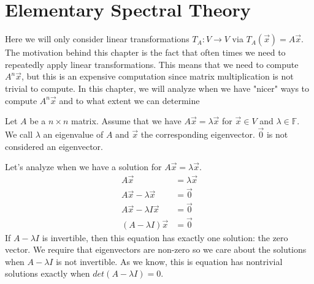 \chapter{Elementary Spectral Theory}

Here we will only consider linear transformations $T_A:V\to V$ via $T_A(\vec{x})=A\vec{x}$. The motivation behind this chapter is the fact that often times we need to repeatedly apply linear transformations. This means that we need to compute $A^n\vec{x}$, but this is an expensive computation since matrix multiplication is not trivial to compute. In this chapter, we will analyze when we have "nicer" ways to compute $A^n\vec{x}$ and to what extent we can determine
\begin{definition}
    Let $A$ be a $n\times n$ matrix. Assume that we have $A\vec{x}=\lambda\vec{x}$ for $\vec{x}\in V$ and $\lambda\in\mathbb{F}$. We call $\lambda$ an eigenvalue of $A$ and $\vec{x}$ the corresponding eigenvector. $\vec{0}$ is not considered an eigenvector.
\end{definition}
Let's analyze when we have a solution for $A\vec{x}=\lambda\vec{x}$.
\begin{align*}
    A\vec{x}&=\lambda\vec{x}\\
    A\vec{x}-\lambda\vec{x}&=\vec{0}\\
    A\vec{x}-\lambda I\vec{x}&=\vec{0}\\
    (A-\lambda I)\vec{x}&=\vec{0}
\end{align*}
If $A-\lambda I$ is invertible, then this equation has exactly one solution: the zero vector. We require that eigenvectors are non-zero so we care about the solutions when $A-\lambda I$ is not invertible. As we know, this is equation has nontrivial solutions exactly when $det(A-\lambda I)=0$.
